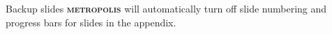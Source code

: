 \documentclass[10pt]{beamer}
\newcommand{\themename}{\textbf{\textsc{metropolis}}\xspace}
\begin{document}
\begin{CJK}{UTF8}{gbsn}
\begin{frame}[fragile]{Backup slides}
  \themename will automatically turn off slide numbering and progress bars for
 slides in the appendix.
\end{frame}



\end{CJK}
\end{document}
